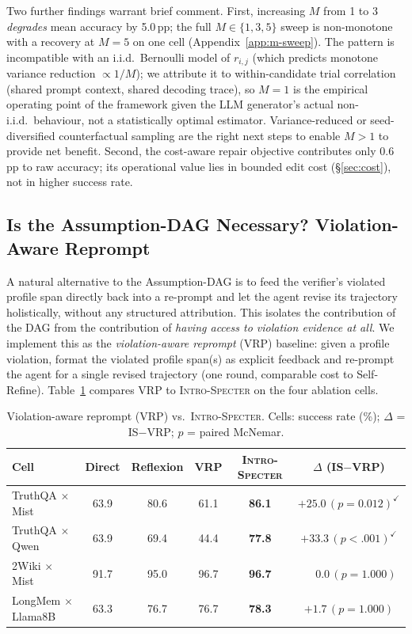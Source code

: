 \documentclass{article}
\newcommand{\method}{\textsc{Intro-Specter}\xspace}
\begin{document}
Two further findings warrant brief comment. First, increasing $M$ from 1 to 3 \emph{degrades} mean accuracy by 5.0\,pp; the full $M{\in}\{1,3,5\}$ sweep is non-monotone with a recovery at $M{=}5$ on one cell (Appendix~\ref{app:m-sweep}). The pattern is incompatible with an i.i.d.\ Bernoulli model of $r_{i,j}$ (which predicts monotone variance reduction $\propto 1/M$); we attribute it to within-candidate trial correlation (shared prompt context, shared decoding trace), so $M{=}1$ is the empirical operating point of the framework given the LLM generator's actual non-i.i.d.\ behaviour, not a statistically optimal estimator. Variance-reduced or seed-diversified counterfactual sampling are the right next steps to enable $M{>}1$ to provide net benefit. Second, the cost-aware repair objective contributes only $0.6$\,pp to raw accuracy; its operational value lies in bounded edit cost (\S\ref{sec:cost}), not in higher success rate.

\subsection{Is the Assumption-DAG Necessary? Violation-Aware Reprompt}\label{sec:vrp}

A natural alternative to the Assumption-DAG is to feed the verifier's violated profile span directly back into a re-prompt and let the agent revise its trajectory holistically, without any structured attribution. This isolates the contribution of the DAG from the contribution of \emph{having access to violation evidence at all}. We implement this as the \emph{violation-aware reprompt} (VRP) baseline: given a profile violation, format the violated profile span(s) as explicit feedback and re-prompt the agent for a single revised trajectory (one round, comparable cost to Self-Refine). Table~\ref{tab:vrp} compares VRP to \method on the four ablation cells.

\begin{table}[H]\centering\small
\caption{Violation-aware reprompt (VRP) vs.\ \method. Cells: success rate (\%); $\Delta$ = IS$-$VRP; $p$ = paired McNemar.}
\label{tab:vrp}\setlength{\tabcolsep}{4pt}
\begin{tabular}{lccccc}\toprule
Cell & Direct & Reflexion & VRP & \method & $\Delta$ (IS$-$VRP) \\\midrule
TruthQA $\times$ Mist & 63.9 & 80.6 & 61.1 & \textbf{86.1} & $+25.0\,(p{=}0.012)^{\checkmark}$ \\
TruthQA $\times$ Qwen & 63.9 & 69.4 & 44.4 & \textbf{77.8} & $+33.3\,(p{<}.001)^{\checkmark}$ \\
2Wiki $\times$ Mist   & 91.7 & 95.0 & 96.7 & \textbf{96.7} & $\phantom{+0}0.0\,(p{=}1.000)$ \\
LongMem $\times$ Llama8B & 63.3 & 76.7 & 76.7 & \textbf{78.3} & $+1.7\,(p{=}1.000)$ \\
\bottomrule\end{tabular}\end{table}
\end{document}
